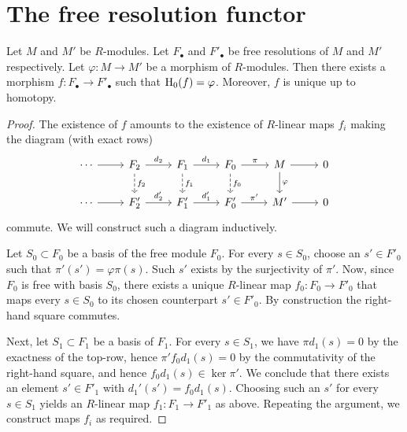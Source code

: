 \section{The free resolution functor}


\begin{theorem}\label{thm:functoriality-of-free-resolutions}
Let $M$ and $M'$ be $R$-modules. Let $F_\bullet$ and $F'_\bullet$ be free resolutions of $M$ and $M'$ respectively. Let $\varphi \colon M\to M'$ be a morphism of $R$-modules. Then there exists a morphism
$f\colon F_\bullet \to F'_\bullet$ such that ${\mathrm H}_0(f) = \varphi$. Moreover, $f$ is unique up to homotopy.
\end{theorem}

\begin{proof}
The existence of $f$ amounts to the existence of $R$-linear maps $f_i$ making the diagram 
(with exact rows)
\[
\begin{tikzcd}
\cdots \arrow{r} & 
	F_2 \arrow[dashed]{d}{f_2} \arrow{r}{d_2} &
	F_1 \arrow[dashed]{d}{f_1} \arrow{r}{d_1} & 
	F_0 \arrow[dashed]{d}{f_0} \arrow{r}{\pi} & M \arrow{d}{\varphi} \arrow{r} & 0 \\
\cdots \arrow{r} & 
	F_2'  \arrow{r}{d'_2} & 
	F_1'  \arrow{r}{d'_1} & 
	F_0' \arrow{r}{\pi'} & M'  \arrow{r} & 0 
\end{tikzcd}
\]
commute. We will construct such a diagram inductively.

 Let $S_0\subset F_0$ be a basis of the free module $F_0$. For every $s\in S_0$, choose an $s'\in F'_0$ such that $\pi'(s')=\varphi\pi(s)$. Such $s'$ exists by the surjectivity of $\pi'$. Now, since $F_0$ is free with basis $S_0$, there exists a unique $R$-linear map $f_0\colon F_0\to F'_0$ that maps every $s\in S_0$ to its chosen counterpart $s'\in F'_0$. By construction the right-hand square commutes. 

Next, let $S_1\subset F_1$ be a basis of $F_1$. For every $s\in S_1$, we have $\pi d_1(s)=0$ by the exactness of the top-row, hence $\pi' f_0 d_1(s) = 0$ by the commutativity of the right-hand square, and hence $f_0d_1(s) \in \ker \pi'$. We conclude that there exists an element $s'\in F'_1$ with $d_1'(s') = f_0d_1(s)$. Choosing such an $s'$ for every $s\in S_1$ yields an $R$-linear map $f_1\colon F_1 \to F'_1$ as above. Repeating the argument, we construct maps $f_i$ as required.


\end{proof}
